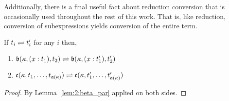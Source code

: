 Additionally, there is a final useful fact about reduction conversion that is occasionally used throughout the rest of this work.
That is, like reduction, conversion of subexpressions yields conversion of the entire term.

\begin{lemma}
    \label{lem:2:conv_congr}
    If $t_i \rightleftharpoons t_i^\prime$ for any $i$ then,
    \begin{enumerate}
        \item $\mathfrak{b}(\kappa, (x : t_1), t_2) \rightleftharpoons \mathfrak{b}(\kappa, (x : t_1^\prime), t_2^\prime)$
        \item $\mathfrak{c}(\kappa, t_1,\ldots,t_{\mathfrak{a}(\kappa)}) \rightleftharpoons \mathfrak{c}(\kappa, t_1^\prime,\ldots,t_{\mathfrak{a}(\kappa)}^\prime)$
    \end{enumerate}
\end{lemma}
\begin{proof}
    By Lemma~\ref{lem:2:beta_par} applied on both sides.
\end{proof}
